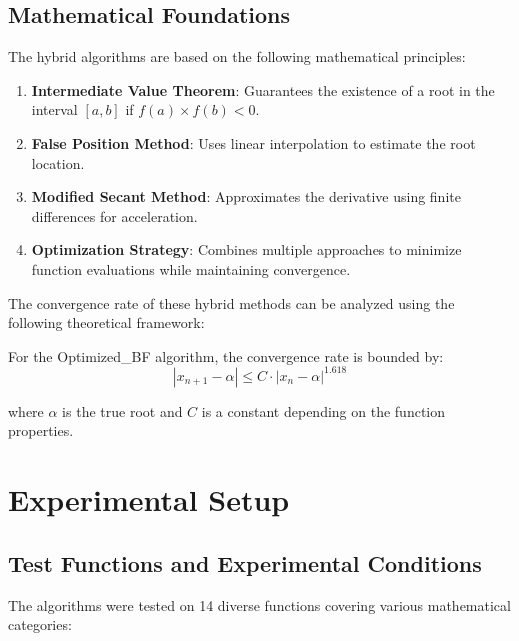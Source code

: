 \documentclass[reprint, amsmath, amssymb, aps, prl]{revtex4-2}
\begin{document}
\subsection{Mathematical Foundations}

The hybrid algorithms are based on the following mathematical principles:

\begin{enumerate}
    \item \textbf{Intermediate Value Theorem}: Guarantees the existence of a root in the interval $[a,b]$ if $f(a) \times f(b) < 0$.
    \item \textbf{False Position Method}: Uses linear interpolation to estimate the root location.
    \item \textbf{Modified Secant Method}: Approximates the derivative using finite differences for acceleration.
    \item \textbf{Optimization Strategy}: Combines multiple approaches to minimize function evaluations while maintaining convergence.
\end{enumerate}

The convergence rate of these hybrid methods can be analyzed using the following theoretical framework:

For the Optimized\_BF algorithm, the convergence rate is bounded by:
\begin{equation}
|x_{n+1} - \alpha| \leq C \cdot |x_n - \alpha|^{1.618}
\end{equation}

where $\alpha$ is the true root and $C$ is a constant depending on the function properties.

\section{Experimental Setup}

\subsection{Test Functions and Experimental Conditions}

The algorithms were tested on 14 diverse functions covering various mathematical categories:
\end{document}
